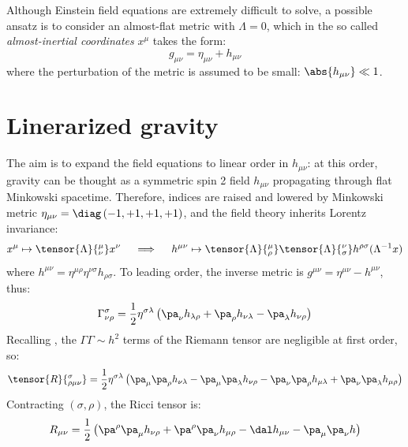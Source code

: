 
Although Einstein field equations are extremely difficult to solve, a possible ansatz is to consider an almost-flat metric with $ \Lambda = 0 $, which in the so called \textit{almost-inertial coordinates} $ x^\mu $ takes the form:
\begin{equation}
  g_{\mu \nu} = \eta_{\mu \nu} + h_{\mu \nu}
  \label{eq:weak-metric}
\end{equation}
where the perturbation of the metric is assumed to be small: $ \abs{h_{\mu \nu}} \ll 1 $.

\section{Linerarized gravity}

The aim is to expand the field equations to linear order in $ h_{\mu \nu} $: at this order, gravity can be thought as a symmetric spin 2 field $ h_{\mu \nu} $ propagating through flat Minkowski spacetime. Therefore, indices are raised and lowered by Minkowski metric $ \eta_{\mu \nu} = \diag \left( -1,+1,+1,+1 \right) $, and the field theory inherits Lorentz invariance:
\begin{equation*}
  x^\mu \mapsto \tensor{\Lambda}{^\mu_\nu} x^\nu
  \quad \implies \quad
  h^{\mu \nu} \mapsto \tensor{\Lambda}{^\mu_\rho} \tensor{\Lambda}{^\nu_\sigma} h^{\rho \sigma} (\Lambda^{-1} x)
\end{equation*}
where $ h^{\mu \nu} = \eta^{\mu \rho} \eta^{\nu \sigma} h_{\rho \sigma} $. To leading order, the inverse metric is $ g^{\mu \nu} = \eta^{\mu \nu} - h^{\mu \nu} $, thus:
\begin{equation}
  \Gamma^\sigma_{\nu \rho} = \frac{1}{2} \eta^{\sigma \lambda} \left( \pa_\nu h_{\lambda \rho} + \pa_\rho h_{\nu \lambda} - \pa_\lambda h_{\nu \rho} \right)
\end{equation}
Recalling , the $ \Gamma \Gamma \sim h^2 $ terms of the Riemann tensor are negligible at first order, so:
\begin{equation}
  \tensor{R}{^\sigma_{\rho \mu \nu}} = \frac{1}{2} \eta^{\sigma \lambda} \left( \pa_\mu \pa_\rho h_{\nu \lambda} - \pa_\mu \pa_\lambda h_{\nu \rho} - \pa_\nu \pa_\rho h_{\mu \lambda} + \pa_\nu \pa_\lambda h_{\mu \rho} \right)
  \label{eq:weak-riem}
\end{equation}
Contracting $ (\sigma,\rho) $, the Ricci tensor is:
\begin{equation}
  R_{\mu \nu} = \frac{1}{2} \left( \pa^\rho \pa_\mu h_{\nu \rho} + \pa^\rho \pa_\nu h_{\mu \rho} - \dal h_{\mu \nu} - \pa_\mu \pa_\nu h \right)
\end{equation}
